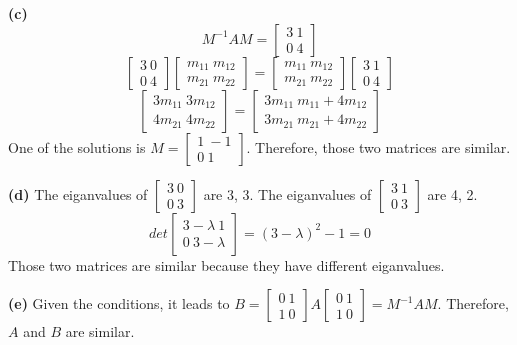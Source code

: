 \documentclass[11pt]{article}
\renewcommand\part[1]{\vspace{.10in}\textbf{(#1)}}
\begin{document}
\part{c} 
$$M^{-1}AM = \begin{bmatrix} 3 \ 1 \\ 0 \ 4 \end{bmatrix}$$
$$\begin{bmatrix} 3 \ 0 \\ 0 \ 4 \end{bmatrix}\begin{bmatrix} m_{11} \ m_{12} \\ m_{21} \ m_{22} \end{bmatrix} = \begin{bmatrix} m_{11} \ m_{12} \\ m_{21} \ m_{22} \end{bmatrix}\begin{bmatrix} 3 \ 1 \\ 0 \ 4 \end{bmatrix}$$
$$\begin{bmatrix} 3m_{11} \ 3m_{12} \\ 4m_{21} \ 4m_{22} \end{bmatrix} = \begin{bmatrix} 3m_{11} \ m_{11} + 4m_{12} \\ 3m_{21} \ m_{21} + 4m_{22} \end{bmatrix}$$
One of the solutions is \(M = \begin{bmatrix} 1 \ -1 \\ 0 \ 1 \end{bmatrix}\). Therefore, those two matrices are similar.

\part{d} The eiganvalues of \(\begin{bmatrix} 3 \ 0 \\ 0 \ 3 \end{bmatrix}\) are 3, 3. The eiganvalues of \(\begin{bmatrix} 3 \ 1 \\ 0 \ 3 \end{bmatrix}\) are 4, 2. 
$$det \begin{bmatrix} 3-\lambda \ 1 \\ 0 \ 3-\lambda \end{bmatrix} = (3-\lambda)^2 - 1 = 0$$
Those two matrices are similar because they have different eiganvalues.

\part{e} Given the conditions, it leads to \(B = \begin{bmatrix} 0 \ 1 \\ 1 \ 0 \end{bmatrix}A\begin{bmatrix} 0 \ 1 \\ 1 \ 0 \end{bmatrix} = M^{-1}AM\). Therefore, \(A\) and \(B\) are similar.
\end{document}
